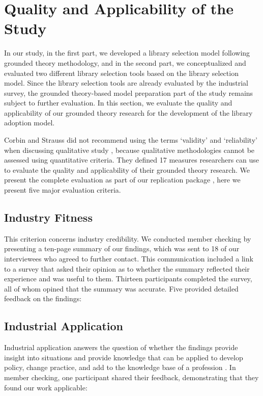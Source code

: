\section{Quality and Applicability of the Study}
In our study, in the first part, we developed a library selection model following grounded theory methodology, and in the second part, we conceptualized and evaluated two different library selection tools based on the library selection model. Since the library selection tools are already evaluated by the industrial survey, the grounded theory-based model preparation part of the study remains subject to further evaluation. In this section, we evaluate the quality and applicability of our grounded theory research for the development of the library adoption model.

Corbin and Strauss did not recommend using the terms `validity' and `reliability' when discussing qualitative study \cite{corbin2014gt}, because qualitative methodologies cannot be assessed using quantitative criteria. They defined 17 measures researchers can use to evaluate the quality and applicability of their grounded theory research. We present the complete evaluation as part of our replication package \cite{website:replication-package}, here we present five major evaluation criteria.

\subsection{Industry Fitness}
This criterion concerns industry credibility. We conducted member checking \cite{creswell2016qualitative} by presenting a ten-page summary of our findings, which was sent to 18 of our interviewees who agreed to further contact. This communication included a link to a survey that asked their opinion as to whether the summary reflected their experience and was useful to them. Thirteen participants completed the survey, all of whom opined that the summary was accurate. Five provided detailed feedback on the findings:

\subsection{Industrial Application} Industrial application answers the question of whether the findings provide insight into situations and provide knowledge that can be applied to develop policy, change practice, and add to the knowledge base of a profession \cite{corbin2014gt}. %
In member checking, one participant shared their feedback, demonstrating that they found our work applicable: 

